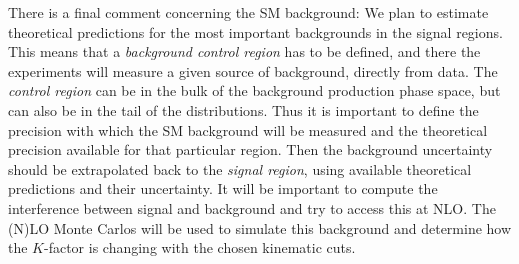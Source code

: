 There is a final comment concerning the SM background: We plan to estimate
theoretical predictions for the most important backgrounds in the signal
regions.
This means that a {\em background control region} has to be defined, and
there the experiments will measure a given source of background, directly
from data.
The {\em control region} can be in the bulk of the background production
phase space, but can also be in the tail of the distributions.
Thus it is important to define the precision with which the SM background
will be measured and the theoretical precision available for that particular
region.
Then the background uncertainty should be extrapolated back to the
{\em signal region}, using available theoretical predictions and their
uncertainty.
It will be important to compute the interference between signal and background
and try to access this at NLO.
The (N)LO Monte Carlos will be used to simulate this background and
determine how the $K$-factor is changing with the chosen kinematic cuts.

\vfill




